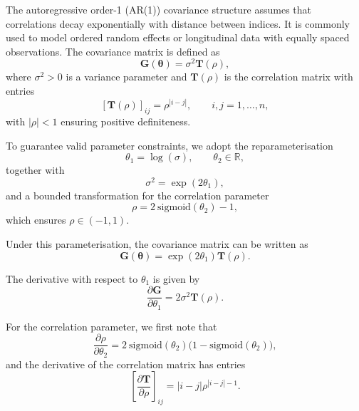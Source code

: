 \documentclass[
  letterpaper,
  DIV=11,
  numbers=noendperiod]{scrartcl}
\begin{document}
The autoregressive order-1 (AR(1)) covariance structure assumes that
correlations decay exponentially with distance between indices. It is
commonly used to model ordered random effects or longitudinal data with
equally spaced observations. The covariance matrix is defined as
\begin{equation}
\symbf{G}(\symbf{\theta}) = \sigma^2 \symbf{T}(\rho),
\end{equation} where \(\sigma^2 > 0\) is a variance parameter and
\(\symbf{T}(\rho)\) is the correlation matrix with entries
\begin{equation}
\left[\symbf{T}(\rho)\right]_{ij} = \rho^{|i-j|}, \qquad i,j = 1,\ldots,n,
\end{equation} with \(|\rho| < 1\) ensuring positive definiteness.

To guarantee valid parameter constraints, we adopt the
reparameterisation \begin{equation}
\theta_1 = \log(\sigma), \qquad \theta_2 \in \mathbb{R},
\end{equation} together with \begin{equation}
\sigma^2 = \exp(2\theta_1),
\end{equation} and a bounded transformation for the correlation
parameter \begin{equation}
\rho = 2~\mathrm{sigmoid}(\theta_2) - 1,
\end{equation} which ensures \(\rho \in (-1,1)\).

Under this parameterisation, the covariance matrix can be written as
\begin{equation}
\symbf{G}(\symbf{\theta}) = \exp(2\theta_1)\symbf{T}(\rho).
\end{equation}

The derivative with respect to \(\theta_1\) is given by \begin{equation}
\frac{\partial \symbf{G}}{\partial \theta_1}
= 2\sigma^2 \symbf{T}(\rho).
\end{equation}

For the correlation parameter, we first note that \begin{equation}
\frac{\partial \rho}{\partial \theta_2}
= 2~\mathrm{sigmoid}(\theta_2)\big(1 - \mathrm{sigmoid}(\theta_2)\big),
\end{equation} and the derivative of the correlation matrix has entries
\begin{equation}
\left[\frac{\partial \symbf{T}}{\partial \rho}\right]_{ij}
= |i-j| \rho^{|i-j|-1}.
\end{equation}
\end{document}
